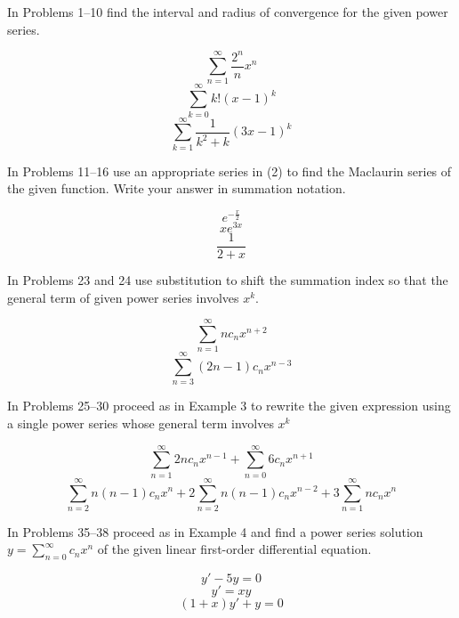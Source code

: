 \documentclass[chapter=6,section=1]{math252homework}
\begin{document}
In Problems 1--10 find the interval and radius of convergence for the given power series.
\begin{problems}[start=3]
	\problem \[ \sum_{n=1}^{\infty} \frac{2^{n}}{n}x^{n}  \] %
	\setcounter{problemsi}{5}
	\problem \[ \sum_{k=0}^{\infty} k!(x-1)^{k} \] %
	\problem \[ \sum_{k=1}^{\infty} \frac{1}{k^{2} + k}(3x - 1)^{k}  \] %
\end{problems}

In Problems 11--16 use an appropriate series in (2) to find the Maclaurin series of the given function. Write your answer in summation notation.
\begin{problems}[start=11]
	\problem \[ e^{-\frac{x}{2}} \] %
	\problem \[ xe^{3x} \] %
	\problem \[ \frac{1}{2 + x} \] %
\end{problems}

In Problems 23 and 24 use substitution to shift the summation index so that the general term of given power series involves $x^{k}$.
\begin{problems}[start=23]
	\problem \[ \sum_{n=1}^{\infty} nc_{n}x^{n+2}  \] %
	\problem \[ \sum_{n=3}^{\infty} (2n-1)c_{n}x^{n-3}  \] %
\end{problems}

In Problems 25--30 proceed as in Example 3 to rewrite the given expression using a single power series whose general term involves $x^{k}$
\begin{problems}[start=27]
	\problem \[ \sum_{n=1}^{\infty} 2nc_{n}x^{n-1} + \sum_{n=0}^{\infty} 6c_{n}x^{n+1}   \] %
	\setcounter{problemsi}{29}
	\problem \[ \sum_{n=2}^{\infty} n(n-1)c_{n}x^{n} + 2 \sum_{n=2}^{\infty} n(n-1)c_{n}x^{n-2} + 3 \sum_{n=1}^{\infty} nc_{n}x^{n} \] %
\end{problems}

In Problems 35--38 proceed as in Example 4 and find a power series solution $y = \sum_{n=0}^{\infty} c_{n}x^{n} $ of the given linear first-order differential equation.
\begin{problems}[start=35]
	\problem \[ y' - 5y = 0 \] %
	\setcounter{problemsi}{36}
	\problem \[ y' = xy \] %
	\problem \[ (1+x)y' + y = 0 \] %
\end{problems}
\end{document}
